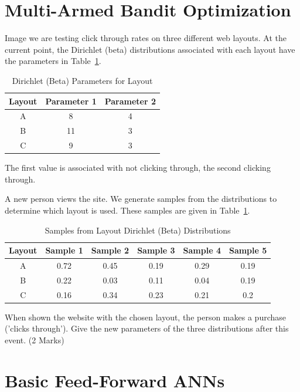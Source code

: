 \documentclass{article}
\begin{document}
\section{Multi-Armed Bandit Optimization}

Image we are testing click through rates on three different web layouts. At the current point, the Dirichlet (beta) distributions associated with each layout have the parameters in Table~\ref{MABO1}.\begin{table}[h!]
\caption{Dirichlet (Beta) Parameters for Layout}
\label{MABO1}
\begin{center}
\begin{tabular}{ |c|c|c| } 
\hline
 Layout & Parameter 1 & Parameter 2 \\
\hline
A &  8  &  4 \\
B &  11  &  3 \\
C &  9  &  3 \\
\hline
\end{tabular}
\end{center}
\end{table}

The first value is associated with not clicking through, the second clicking through.

A new person views the site. We generate samples from the distributions to determine which layout is used. These samples are given in Table~\ref{MABO1}.
\begin{table}[h!]
\caption{Samples from Layout Dirichlet (Beta) Distributions}
\label{MABO2}
\begin{center}
\begin{tabular}{ |c|c|c|c|c|c| } 
\hline
 Layout & Sample 1 & Sample 2 & Sample 3 & Sample 4 & Sample 5 \\
\hline
A &  0.72  &  0.45  &  0.19  &  0.29  &  0.19 \\
B &  0.22  &  0.03  &  0.11  &  0.04  &  0.19 \\
C &  0.16  &  0.34  &  0.23  &  0.21  &  0.2 \\
\hline
\end{tabular}
\end{center}
\end{table}


When shown the website with the chosen layout, the person makes a purchase ('clicks through'). Give the new parameters of the three distributions after this event. (2 Marks)
\clearpage
\section{Basic Feed-Forward ANNs}
\end{document}

